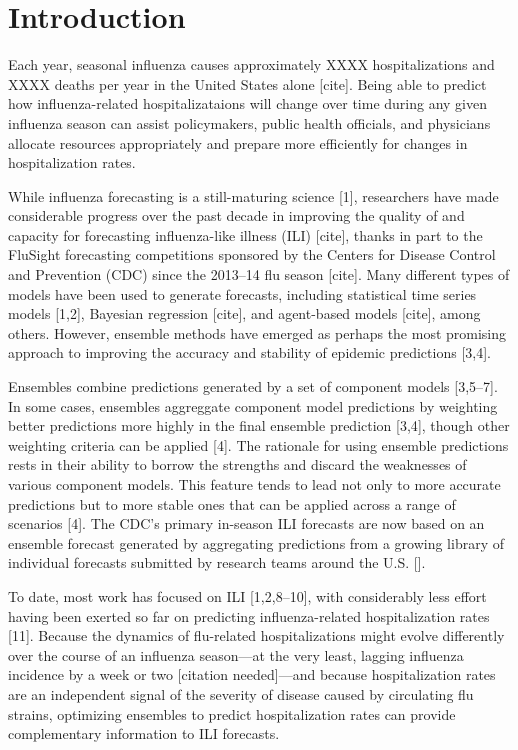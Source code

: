 \documentclass[10pt,letterpaper]{article}
\begin{document}
\hypertarget{introduction}{%
\section{Introduction}\label{introduction}}

Each year, seasonal influenza causes approximately XXXX hospitalizations
and XXXX deaths per year in the United States alone {[}cite{]}. Being
able to predict how influenza-related hospitalizataions will change over
time during any given influenza season can assist policymakers, public
health officials, and physicians allocate resources appropriately and
prepare more efficiently for changes in hospitalization rates.

While influenza forecasting is a still-maturing science {[}1{]},
researchers have made considerable progress over the past decade in
improving the quality of and capacity for forecasting influenza-like
illness (ILI) {[}cite{]}, thanks in part to the FluSight forecasting
competitions sponsored by the Centers for Disease Control and Prevention
(CDC) since the 2013--14 flu season {[}cite{]}. Many different types of
models have been used to generate forecasts, including statistical time
series models {[}1,2{]}, Bayesian regression {[}cite{]}, and agent-based
models {[}cite{]}, among others. However, ensemble methods have emerged
as perhaps the most promising approach to improving the accuracy and
stability of epidemic predictions {[}3,4{]}.

Ensembles combine predictions generated by a set of component models
{[}3,5--7{]}. In some cases, ensembles aggreggate component model
predictions by weighting better predictions more highly in the final
ensemble prediction {[}3,4{]}, though other weighting criteria can be
applied {[}4{]}. The rationale for using ensemble predictions rests in
their ability to borrow the strengths and discard the weaknesses of
various component models. This feature tends to lead not only to more
accurate predictions but to more stable ones that can be applied across
a range of scenarios {[}4{]}. The CDC's primary in-season ILI forecasts
are now based on an ensemble forecast generated by aggregating
predictions from a growing library of individual forecasts submitted by
research teams around the U.S. {[}{]}.

To date, most work has focused on ILI {[}1,2,8--10{]}, with considerably
less effort having been exerted so far on predicting influenza-related
hospitalization rates {[}11{]}. Because the dynamics of flu-related
hospitalizations might evolve differently over the course of an
influenza season---at the very least, lagging influenza incidence by a
week or two {[}citation needed{]}---and because hospitalization rates
are an independent signal of the severity of disease caused by
circulating flu strains, optimizing ensembles to predict hospitalization
rates can provide complementary information to ILI forecasts.
\end{document}
